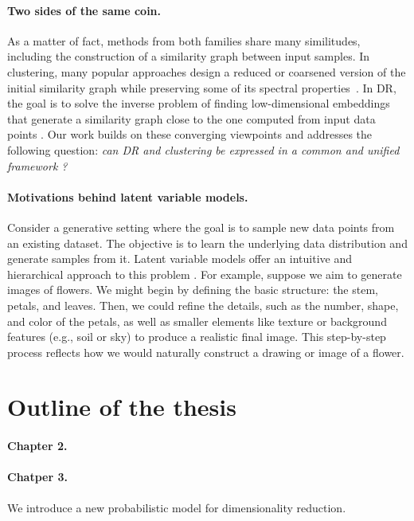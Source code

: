 \paragraph{Two sides of the same coin.} As a matter of fact, methods from both families share many similitudes, %
including the construction of a similarity graph between input samples. In clustering, many popular approaches design a reduced or coarsened version of the initial similarity graph while preserving some of its spectral properties~\citep{von2007tutorial, schaeffer2007graph}. 
In DR, the goal is to solve the inverse problem of finding low-dimensional embeddings that generate a similarity graph close to the %
one computed from input data points \citep{ham2004kernel,hinton2002stochastic}.
Our work builds on these converging viewpoints and addresses the following question: \emph{can DR and clustering  be expressed in a common and unified framework ?}



\paragraph{Motivations behind latent variable models.} 
Consider a generative setting where the goal is to sample new data points from an existing dataset. The objective is to learn the underlying data distribution and generate samples from it. Latent variable models offer an intuitive and hierarchical approach to this problem \citep{bishop2006pattern}. For example, suppose we aim to generate images of flowers. We might begin by defining the basic structure: the stem, petals, and leaves. Then, we could refine the details, such as the number, shape, and color of the petals, as well as smaller elements like texture or background features (e.g., soil or sky) to produce a realistic final image. This step-by-step process reflects how we would naturally construct a drawing or image of a flower.


\section*{Outline of the thesis}

\paragraph{Chapter 2.}

\paragraph{Chatper 3.} We introduce a new probabilistic model for dimensionality reduction.

